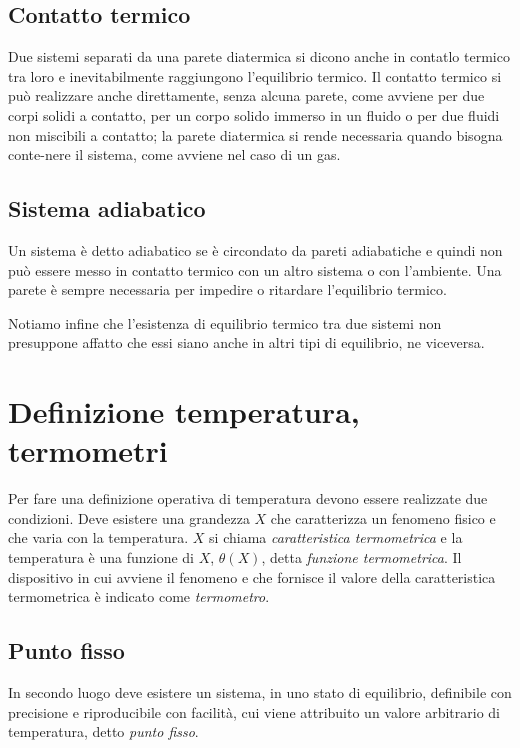 \documentclass[class=book, crop=false, oneside, 12pt]{standalone}
\begin{document}
\subsection{Contatto termico}

Due sistemi separati da una parete diatermica si dicono anche in contatlo termico tra loro e inevitabilmente raggiungono l'equilibrio termico. 
Il contatto termico si può realizzare anche direttamente, senza alcuna parete, come avviene per due corpi solidi a contatto, per un corpo solido immerso in un fluido o per due fluidi non miscibili a contatto; la parete diatermica si rende necessaria quando bisogna conte-nere il sistema, come avviene nel caso di un gas. 

\subsection{Sistema adiabatico}

Un sistema è detto adiabatico se è circondato da pareti adiabatiche e quindi non può essere messo in contatto termico con un altro sistema o  con l'ambiente. 
Una parete è sempre necessaria per impedire o ritardare l'equilibrio termico. 

Notiamo infine che l'esistenza di equilibrio termico tra due sistemi non presuppone affatto che essi siano anche in altri tipi di equilibrio, ne viceversa.

\section{Definizione temperatura, termometri}

Per fare una definizione operativa di temperatura devono essere realizzate due condizioni. 
Deve esistere una grandezza \(X\) che caratterizza un fenomeno fisico e che varia con la temperatura. 
\(X\) si chiama \emph{caratteristica termometrica} e la temperatura è una funzione di \(X\), \(\theta (X)\), detta \emph{funzione termometrica}. 
Il dispositivo in cui avviene il fenomeno e che fornisce il valore della caratteristica termometrica è indicato come \emph{termometro}.

\subsection{Punto fisso}

In secondo luogo deve esistere un sistema, in uno stato di equilibrio, definibile con precisione e riproducibile con facilità, cui viene attribuito un valore arbitrario di temperatura, detto \emph{punto fisso}.
\end{document}
